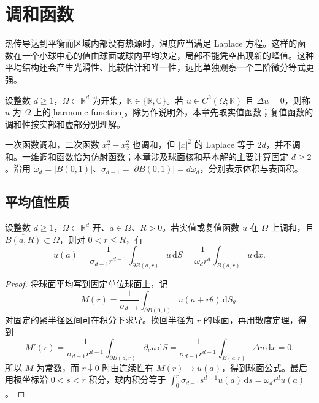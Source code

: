 \section{调和函数}
\label{b2:sec:1301}

热传导达到平衡而区域内部没有热源时，温度应当满足 Laplace 方程。这样的函数在一个小球中心的值由球面或球内平均决定，局部不能凭空出现新的峰值。这种平均结构还会产生光滑性、比较估计和唯一性，远比单独观察一个二阶微分等式更强。

\begin{definition}\label{b2:def:13-harmonic}
设整数 \(d\geq1\)，\(\Omega\subset\mathbb R^d\) 为开集，\(\mathbb K\in\{\mathbb R,\mathbb C\}\)。若 \(u\in C^2(\Omega;\mathbb K)\) 且 \(\Delta u=0\)，则称 \(u\) 为 \(\Omega\) 上的[harmonic function]。除另作说明外，本章先取实值函数；复值函数的调和性按实部和虚部分别理解。
\end{definition}

一次函数调和，二次函数 \(x_1^2-x_2^2\) 也调和，但 \(|x|^2\) 的 Laplace 等于 \(2d\)，并不调和。一维调和函数恰为仿射函数；本章涉及球面核和基本解的主要计算固定 \(d\geq2\)。沿用 \(\omega_d=|B(0,1)|\)、\(\sigma_{d-1}=|\partial B(0,1)|=d\omega_d\)，分别表示体积与表面积。

\subsection{平均值性质}
\label{b2:subsec:130101}

\begin{theorem}[调和函数的平均值性质]\label{b2:thm:13-mean-value}
设整数 \(d\geq1\)，\(\Omega\subset\mathbb R^d\) 开、\(a\in\Omega\)、\(R>0\)。若实值或复值函数 \(u\) 在 \(\Omega\) 上调和，且 \(\overline{B(a,R)}\subset\Omega\)，则对 \(0<r\leq R\)，有
\[
 u(a)=\dfrac1{\sigma_{d-1}r^{d-1}}\int_{\partial B(a,r)}u\,\mathrm{d}S
 =\dfrac1{\omega_dr^d}\int_{B(a,r)}u\,\mathrm{d}x.
\]
\end{theorem}
\begin{proof}
将球面平均写到固定单位球面上，记
\[
 M(r)=\dfrac1{\sigma_{d-1}}\int_{\partial B(0,1)}u(a+r\theta)\,\mathrm{d}S_\theta.
\]
对固定的紧半径区间可在积分下求导。换回半径为 \(r\) 的球面，再用散度定理，得到
\[
 M'(r)=\dfrac1{\sigma_{d-1}r^{d-1}}
          \int_{\partial B(a,r)}\partial_\nu u\,\mathrm{d}S
       =\dfrac1{\sigma_{d-1}r^{d-1}}\int_{B(a,r)}\Delta u\,\mathrm{d}x=0.
\]
所以 \(M\) 为常数，而 \(r\downarrow0\) 时由连续性有 \(M(r)\to u(a)\)，得到球面公式。最后用极坐标沿 \(0<s<r\) 积分，球内积分等于 \(\int_0^r\sigma_{d-1}s^{d-1}u(a)\,\mathrm{d}s=\omega_dr^du(a)\)。
\end{proof}


